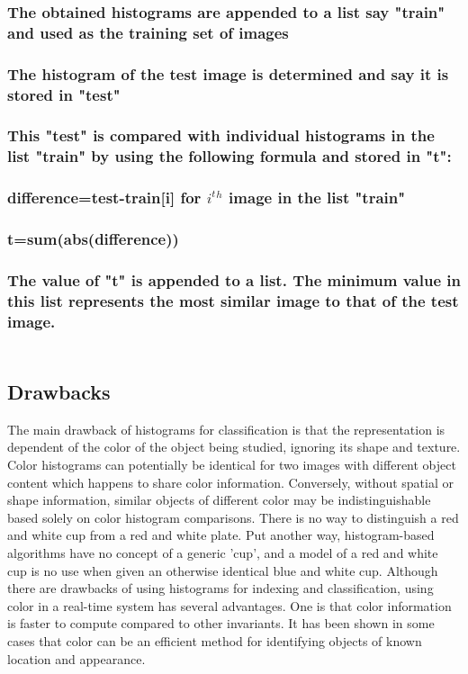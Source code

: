 \documentclass[10pt,a4paper]{article}
\begin{document}
\subsubsection{The obtained histograms are appended to a list say "train" and used as the training set of images }
\subsubsection{The histogram of the test image is determined and say it is stored in "test"}
\subsubsection{This "test" is compared with individual histograms in the list "train" by using the following formula and stored in "t":\\ \\
			difference=test-train[i] for $i^t$$^h$  image in the list "train" \\			
			\\ t=sum(abs(difference))}
\subsubsection{The value of "t" is appended to a list. 
The minimum value in this list represents the most similar image to that of the test image.\\ \\ } 
			 
\subsection{Drawbacks}
The main drawback of histograms for classification is that the representation is dependent of the color of the object being studied, ignoring its shape and texture. Color histograms can potentially be identical for two images with different object content which happens to share color information. Conversely, without spatial or shape information, similar objects of different color may be indistinguishable based solely on color histogram comparisons. There is no way to distinguish a red and white cup from a red and white plate. Put another way, histogram-based algorithms have no concept of a generic 'cup', and a model of a red and white cup is no use when given an otherwise identical blue and white cup.
 Although there are drawbacks of using histograms for indexing and classification, using color in a real-time system has several advantages. One is that color information is faster to compute compared to other invariants. It has been shown in some cases that color can be an efficient method for identifying objects of known location and appearance.
\end{document}
